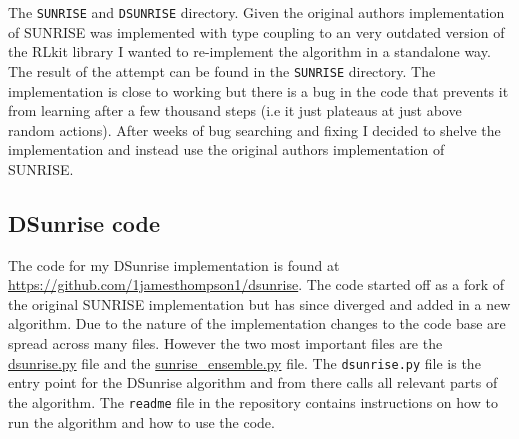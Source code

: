 The \texttt{SUNRISE} and \texttt{DSUNRISE} directory. Given the original authors implementation of SUNRISE was implemented with type coupling to an very outdated version of the RLkit library I wanted to re-implement the algorithm in a standalone way. The result of the attempt can be found in the \texttt{SUNRISE} directory. The implementation is close to working but there is a bug in the code that prevents it from learning after a few thousand steps (i.e it just plateaus at just above random actions). After weeks of bug searching and fixing I decided to shelve the implementation and instead use the original authors implementation of SUNRISE.

\subsection{DSunrise code}
The code for my DSunrise implementation is found at \url{https://github.com/1jamesthompson1/dsunrise}. The code started off as a fork of the original SUNRISE implementation but has since diverged and added in a new algorithm. Due to the nature of the implementation changes to the code base are spread across many files. However the two most important files are the \href{https://github.com/1jamesthompson1/dsunrise/blob/9d3b6fd8cb65dabcea6cbca64bfc4e84f7c89b80/OpenAIGym_SAC/examples/dsunrise.py}{dsunrise.py} file and the \href{https://github.com/1jamesthompson1/dsunrise/blob/9d3b6fd8cb65dabcea6cbca64bfc4e84f7c89b80/OpenAIGym_SAC/examples/sunrise\_ensemble.py}{sunrise\_ensemble.py} file. The \texttt{dsunrise.py} file is the entry point for the DSunrise algorithm and from there calls all relevant parts of the algorithm. The \texttt{readme} file in the repository contains instructions on how to run the algorithm and how to use the code.